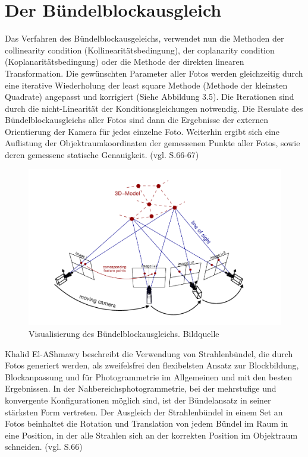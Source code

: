 \section{Der Bündelblockausgleich}

Das Verfahren des Bündelblockausgeleichs, verwendet nun die Methoden der \glqq collinearity condition \grqq{} (Kollinearitätsbedingung), der \glqq coplanarity condition\grqq{} (Koplanaritätsbedingung) oder die Methode der direkten linearen Transformation. Die gewünschten Parameter aller Fotos werden gleichzeitig durch eine iterative Wiederholung der \glqq least square\grqq{} Methode (Methode der kleinsten Quadrate) angepasst und korrigiert (Siehe Abbildung 3.5). Die Iterationen sind durch die nicht-Linearität der Konditionsgleichungen notwendig. Die Resulate des Bündelblockausgleichs aller Fotos sind dann die Ergebnisse der externen Orientierung der Kamera für jedes einzelne Foto. Weiterhin ergibt sich eine Auflistung der Objektraumkoordinaten der gemessenen Punkte aller Fotos, sowie deren gemessene statische Genauigkeit. (vgl. \cite{comparative_conditions_study} S.66-67)

\begin{figure}[H]
	\centering
	\includegraphics[scale=0.6]{bundle.png}
	\caption{Visualisierung des Bündelblockausgleichs. Bildquelle \cite{efficient_bundle}}
\end{figure}

Khalid El-AShmawy \cite{comparative_conditions_study} beschreibt die Verwendung von Strahlenbündel, die durch Fotos generiert werden, als zweifelsfrei den flexibelsten Ansatz zur Blockbildung, Blockanpassung und für Photogrammetrie im Allgemeinen und mit den besten Ergebnissen. In der Nahbereichsphotogrammetrie, bei der mehrstufige und konvergente Konfigurationen möglich sind, ist der Bündelansatz in seiner stärksten Form vertreten. 
Der Ausgleich der Strahlenbündel in einem Set an Fotos beinhaltet die Rotation und Translation von jedem Bündel im Raum in eine Position, in der alle Strahlen sich an der korrekten Position im Objektraum schneiden. (vgl. \cite{comparative_conditions_study} S.66)

